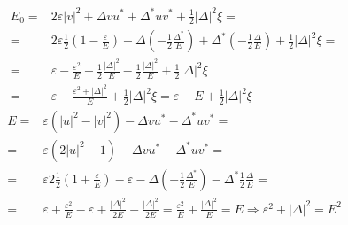 \documentclass[class=article, crop=false]{standalone}
\begin{document}
\begin{equation}\label{key}
	\begin{split}
		E_{0} = & 2 \varepsilon |v|^{2} + \Delta v u^{ \ast} + \Delta^{ \ast} u v^{ \ast} + \frac{1}{2} | \Delta|^{2} \xi = \\
		= & 2 \varepsilon \frac{1}{2} \left( 1 - \frac{ \varepsilon}{E} \right) + \Delta \left( - \frac{1}{2} \frac{ \Delta^{ \ast}}{E} \right) + \Delta^{ \ast} \left( - \frac{1}{2} \frac{ \Delta}{E} \right) + \frac{1}{2} | \Delta|^{2} \xi = \\
		= & \varepsilon - \frac{ \varepsilon^{2}}{E} - \frac{1}{2} \frac{| \Delta|^{2}}{E} - \frac{1}{2} \frac{| \Delta|^{2}}{E} + \frac{1}{2} | \Delta|^{2} \xi \\
		= & \varepsilon - \frac{ \varepsilon^{2} + | \Delta|^{2}}{E} + \frac{1}{2} | \Delta|^{2} \xi = \varepsilon - E + \frac{1}{2} | \Delta|^{2} \xi
	\end{split}
\end{equation}
\begin{equation}\label{key}
	\begin{split}
		E = & \varepsilon (|u|^{2} - |v|^{2}) - \Delta v u^{ \ast} - \Delta^{ \ast} u v^{ \ast} = \\
		= & \varepsilon (2 |u|^{2} - 1) - \Delta v u^{ \ast} - \Delta^{ \ast} u v^{ \ast} = \\
		= & \varepsilon 2 \frac{1}{2} \left( 1 + \frac{ \varepsilon}{E} \right) - \varepsilon - \Delta \left( - \frac{1}{2} \frac{ \Delta^{ \ast}}{E} \right) - \Delta^{ \ast} \frac{1}{2} \frac{ \Delta}{E} = \\
		= & \varepsilon + \frac{ \varepsilon^{2}}{E} - \varepsilon + \frac{| \Delta|^{2}}{2 E} - \frac{| \Delta|^{2}}{2 E} = \frac{ \varepsilon^{2}}{E} + \frac{| \Delta|^{2}}{E} = E \Rightarrow \varepsilon^{2} + | \Delta|^{2} = E^{2}
	\end{split}
\end{equation}
\end{document}
